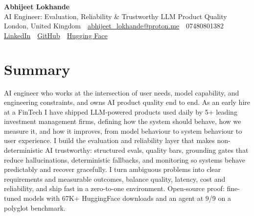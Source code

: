 \documentclass[10pt,a4paper]{article}
\newcommand{\sep}{\,\textcolor{accent!60}{\textbar}\,}
\begin{document}
\begin{center}
  {\fontsize{24}{26}\selectfont\bfseries Abhijeet Lokhande}\\[3pt]
  {\color{accent}\large AI Engineer: Evaluation, Reliability \& Trustworthy LLM Product Quality}\\[5pt]
  {\small
    London, United Kingdom \sep
    \href{mailto:abhijeet_lokhande@proton.me}{abhijeet\_lokhande@proton.me} \sep
    07480801382 \\[2pt]
    \href{https://www.linkedin.com/in/ablds/}{LinkedIn} \sep
    \href{https://github.com/abhijeetscode}{GitHub} \sep
    \href{https://huggingface.co/ab-ai}{Hugging Face}
  }
\end{center}
\vspace{2pt}

\section{Summary}
AI engineer who works at the intersection of user needs, model capability, and engineering constraints, and owns AI product quality end to end. As an early hire at a FinTech I have shipped LLM-powered products used daily by 5+ leading investment management firms, defining how the system should behave, how we measure it, and how it improves, from model behaviour to system behaviour to user experience. I build the evaluation and reliability layer that makes non-deterministic AI trustworthy: structured evals, quality bars, grounding gates that reduce hallucinations, deterministic fallbacks, and monitoring so systems behave predictably and recover gracefully. I turn ambiguous problems into clear requirements and measurable outcomes, balance quality, latency, cost and reliability, and ship fast in a zero-to-one environment. Open-source proof: fine-tuned models with 67K+ HuggingFace downloads and an agent at 9/9 on a polyglot benchmark.

\end{document}
